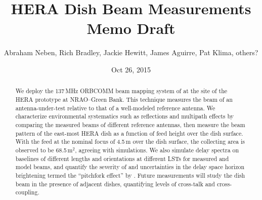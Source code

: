 \documentclass[preprint]{aastex}
\begin{document}
\title{HERA Dish Beam Measurements Memo Draft}


\author{Abraham Neben, Rich Bradley, Jackie Hewitt, James Aguirre, Pat Klima, others?}

\author{Oct 26, 2015}



\begin{abstract}
We deploy the 137\,MHz ORBCOMM beam mapping system of \citet{neben15} at the site of the HERA prototype at NRAO--Green Bank. This technique measures the beam of an antenna-under-test relative to that of a well-modeled reference antenna. We characterize environmental systematics such as reflections and multipath effects by comparing the measured beams of different reference antennas, then measure the beam pattern of the east-most HERA dish as a function of feed height over the dish surface. With the feed at the nominal focus of 4.5\,m over the dish surface, the collecting area is observed to be 68.5\,m$^2$, agreeing with simulations. We also simulate delay spectra on baselines of different lengths and orientations at different LSTs for measured and model beams, and quantify the severity of and uncertainties in the delay space horizon brightening termed the ``pitchfork effect'' by \citet{nithya15}. Future measurements will study the dish beam in the presence of adjacent dishes, quantifying levels of cross-talk and cross-coupling.
\end{abstract}
\end{document}
